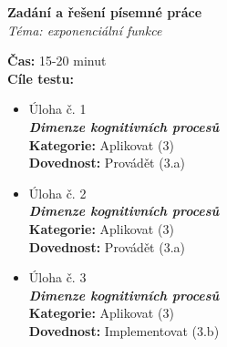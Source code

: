 \centering\Large\textbf{Zadání a řešení písemné práce}\\
\centering\normalsize\textit{Téma: exponenciální funkce}

\raggedright
\textbf{Čas:} 15-20 minut\\
\textbf{Cíle testu:}
\noindent
\begin{itemize}[topsep=0pt]
  \item Úloha č. 1\\
        \textbf{\textit{Dimenze kognitivních procesů}}\\
        \textbf{Kategorie:} Aplikovat (3)\\
        \textbf{Dovednost:} Provádět (3.a)
  \item Úloha č. 2\\
        \textbf{\textit{Dimenze kognitivních procesů}}\\
        \textbf{Kategorie:} Aplikovat (3)\\
        \textbf{Dovednost:} Provádět (3.a)
  \item Úloha č. 3\\
        \textbf{\textit{Dimenze kognitivních procesů}}\\
        \textbf{Kategorie:} Aplikovat (3)\\
        \textbf{Dovednost:} Implementovat (3.b)
\end{itemize}
